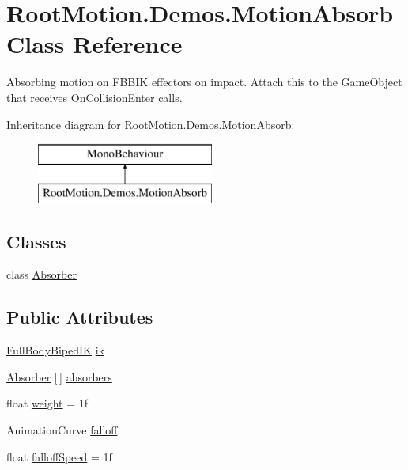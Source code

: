 \hypertarget{class_root_motion_1_1_demos_1_1_motion_absorb}{}\section{Root\+Motion.\+Demos.\+Motion\+Absorb Class Reference}
\label{class_root_motion_1_1_demos_1_1_motion_absorb}


Absorbing motion on F\+B\+B\+IK effectors on impact. Attach this to the Game\+Object that receives On\+Collision\+Enter calls.  


Inheritance diagram for Root\+Motion.\+Demos.\+Motion\+Absorb\+:\begin{figure}[H]
\begin{center}
\leavevmode
\includegraphics[height=2.000000cm]{class_root_motion_1_1_demos_1_1_motion_absorb}
\end{center}
\end{figure}
\subsection*{Classes}
\begin{DoxyCompactItemize}
\item 
class \mbox{\hyperlink{class_root_motion_1_1_demos_1_1_motion_absorb_1_1_absorber}{Absorber}}
\end{DoxyCompactItemize}
\subsection*{Public Attributes}
\begin{DoxyCompactItemize}
\item 
\mbox{\hyperlink{class_root_motion_1_1_final_i_k_1_1_full_body_biped_i_k}{Full\+Body\+Biped\+IK}} \mbox{\hyperlink{class_root_motion_1_1_demos_1_1_motion_absorb_a93cb781d0494ed4290abbeac09870743}{ik}}
\item 
\mbox{\hyperlink{class_root_motion_1_1_demos_1_1_motion_absorb_1_1_absorber}{Absorber}} \mbox{[}$\,$\mbox{]} \mbox{\hyperlink{class_root_motion_1_1_demos_1_1_motion_absorb_a8f775453da2cb4e35894a35ebac6db87}{absorbers}}
\item 
float \mbox{\hyperlink{class_root_motion_1_1_demos_1_1_motion_absorb_a3235cd892103d90e4b7ec3c2f4a19a89}{weight}} = 1f
\item 
Animation\+Curve \mbox{\hyperlink{class_root_motion_1_1_demos_1_1_motion_absorb_af55f2f82215cf2cd6926e27bde90f20a}{falloff}}
\item 
float \mbox{\hyperlink{class_root_motion_1_1_demos_1_1_motion_absorb_aa7046c4008194e45014c3cf21c8e4094}{falloff\+Speed}} = 1f
\end{DoxyCompactItemize}


